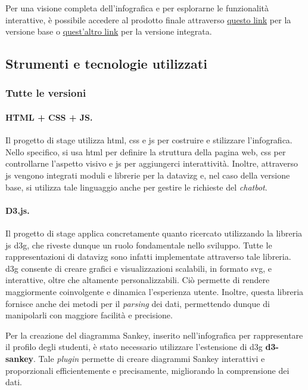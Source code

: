 Per una visione completa dell'infografica e per esplorarne le funzionalità interattive, è possibile accedere al prodotto finale attraverso \href{https://github.com/jeskarr/progetto_stage/tree/main/infographic-example}{questo link} 
per la versione base o \href{https://github.com/jeskarr/progetto_stage/tree/VERSIONE_INTEGRATA/infographic-example}{quest'altro link} per la versione integrata.


\subsection{Strumenti e tecnologie utilizzati}\label{subsec:tecnologie}
\subsubsection{Tutte le versioni}
\paragraph{HTML + CSS + JS.}
Il progetto di stage utilizza \gls{html}, \gls{css} e \gls{js} per costruire e stilizzare l'infografica. Nello specifico, si usa \gls{html} per definire la struttura della pagina web, \gls{css} per controllarne l'aspetto visivo 
e \gls{js} per aggiungerci interattività. Inoltre, attraverso \gls{js} vengono integrati moduli e librerie per la \gls{datavizg} e, nel caso della versione base, si utilizza tale linguaggio anche per gestire le richieste del \emph{chatbot}.

\paragraph{D3.js.}
Il progetto di stage applica concretamente quanto ricercato utilizzando la libreria \gls{js} \gls{d3g}, che riveste dunque un ruolo fondamentale nello sviluppo.
Tutte le rappresentazioni di \gls{datavizg} sono infatti implementate attraverso tale libreria.
\gls{d3g} consente di creare grafici e visualizzazioni scalabili, in formato \gls{svg}, e interattive, oltre che altamente personalizzabili. 
Ciò permette di rendere maggiormente coinvolgente e dinamica l'esperienza utente. 
Inoltre, questa libreria fornisce anche dei metodi per il \emph{parsing} dei dati, permettendo dunque di manipolarli con maggiore facilità e precisione.

Per la creazione del diagramma Sankey, inserito nell'infografica per rappresentare il profilo degli studenti, è stato necessario utilizzare l'estensione di \gls{d3g}
\textbf{d3-sankey}. Tale \emph{plugin} permette di creare diagrammi Sankey interattivi e proporzionali efficientemente e precisamente, migliorando la comprensione dei dati.

